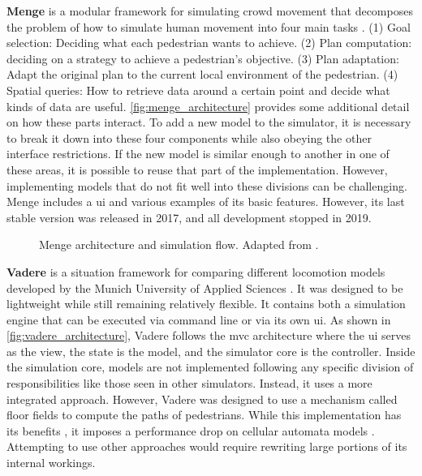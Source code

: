 \documentclass[twoside, 11pt]{article}
\begin{document}
\textbf{Menge} is a modular framework for simulating crowd movement that decomposes the problem of how to simulate human movement into four main tasks \cite{curtisMengeModularFramework2016}. (1) Goal selection: Deciding what each pedestrian wants to achieve. (2) Plan computation: deciding on a strategy to achieve a pedestrian's objective. (3) Plan adaptation: Adapt the original plan to the current local environment of the pedestrian. (4) Spatial queries: How to retrieve data around a certain point and decide what kinds of data are useful. \autoref{fig:menge_architecture} provides some additional detail on how these parts interact. To add a new model to the simulator, it is necessary to break it down into these four components while also obeying the other interface restrictions. If the new model is similar enough to another in one of these areas, it is possible to reuse that part of the implementation. However, implementing models that do not fit well into these divisions can be challenging. Menge includes a \gls{ui} and various examples of its basic features. However, its last stable version was released in 2017, and all development stopped in 2019.

\begin{figure}[h]
  \centering
  
  \caption[Menge architecture and simulation flow]{Menge architecture and simulation flow. Adapted from \cite{curtisMengeModularFramework2016}.}
  \label{fig:menge_architecture}
\end{figure}


\textbf{Vadere} is a situation framework for comparing different locomotion models developed by the Munich University of Applied Sciences \cite{kleinmeierVadereOpenSourceSimulation2019}. It was designed to be lightweight while still remaining relatively flexible. It contains both a simulation engine that can be executed via command line or via its own \gls{ui}. As shown in \autoref{fig:vadere_architecture}, Vadere follows the \gls{mvc} architecture where the \gls{ui} serves as the view, the state is the model, and the simulator core is the controller. Inside the simulation core, models are not implemented following any specific division of responsibilities like those seen in other simulators. Instead, it uses a more integrated approach. However, Vadere was designed to use a mechanism called floor fields to compute the paths of pedestrians. While this implementation has its benefits \cite{seitzSuperpositionPrincipleConceptual2016}, it imposes a performance drop on cellular automata models \cite{kleinmeierVadereOpenSourceSimulation2019}. Attempting to use other approaches would require rewriting large portions of its internal workings.
\end{document}
